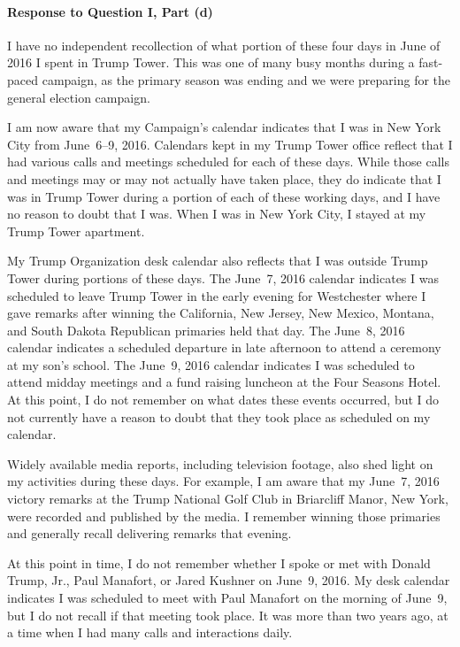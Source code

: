 \paragraph*{Response to Question I, Part (d)}

I have no independent recollection of what portion of these four days in June of 2016 I spent in Trump Tower.
This was one of many busy months during a fast-paced campaign, as the primary season was ending and we were preparing for the general election campaign.

I am now aware that my Campaign's calendar indicates that I was in New York City from June~6--9, 2016.
Calendars kept in my Trump Tower office reflect that I had various calls and meetings scheduled for each of these days.
While those calls and meetings may or may not actually have taken place, they do indicate that I was in Trump Tower during a portion of each of these working days, and I have no reason to doubt that I was.
When I was in New York City, I stayed at my Trump Tower apartment.

My Trump Organization desk calendar also reflects that I was outside Trump Tower during portions of these days.
The June~7, 2016 calendar indicates I was scheduled to leave Trump Tower in the early evening for Westchester where I gave remarks after winning the California, New Jersey, New Mexico, Montana, and South Dakota Republican primaries held that day.
The June~8, 2016 calendar indicates a scheduled departure in late afternoon to attend a ceremony at my son's school.
The June~9, 2016 calendar indicates I was scheduled to attend midday meetings and a fund raising luncheon at the Four Seasons Hotel.
At this point, I do not remember on what dates these events occurred, but I do not currently have a reason to doubt that they took place as scheduled on my calendar.

Widely available media reports, including television footage, also shed light on my activities during these days.
For example, I am aware that my June~7, 2016 victory remarks at the Trump National Golf Club in Briarcliff Manor, New York, were recorded and published by the media.
I remember winning those primaries and generally recall delivering remarks that evening.

At this point in time, I do not remember whether I spoke or met with Donald Trump, Jr., Paul Manafort, or Jared Kushner on June~9, 2016.
My desk calendar indicates I was scheduled to meet with Paul Manafort on the morning of June~9, but I do not recall if that meeting took place.
It was more than two years ago, at a time when I had many calls and interactions daily.

